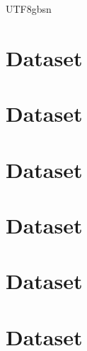 \documentclass{article}%
\begin{document}
\begin{CJK}{UTF8}{gbsn}


\section{Dataset}
\section{Dataset}
\section{Dataset}
\section{Dataset}
\section{Dataset}
\section{Dataset}

\end{CJK}
\end{document}
